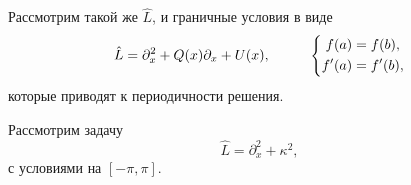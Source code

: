 
Рассмотрим такой же $\hat{L}$, и граничные условия в виде
\begin{equation*}
    \hat{L} = \partial_x^2 + Q(x) \partial_x + U(x),
    \hspace{10 mm}
    \left\{\begin{aligned}
        f(a) &= f(b), \\
        f'(a) &= f'(b),
    \end{aligned}\right.
\end{equation*}
которые приводят к периодичности решения. 


Рассмотрим задачу
\begin{equation*}
    \hat{L} = \partial_x^2 + \kappa^2,
\end{equation*}
с условиями на $[-\pi, \pi]$. 

